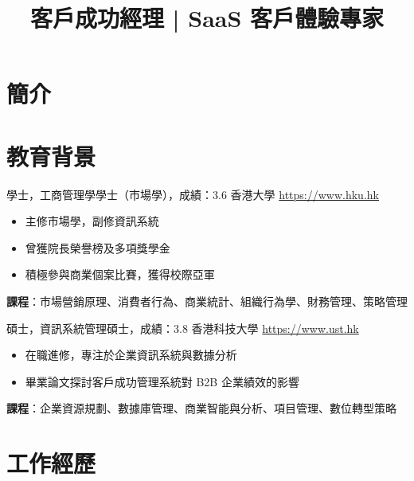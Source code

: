 \documentclass[a4paper, serif, 10pt]{moderncv}
\title{客戶成功經理 | SaaS 客戶體驗專家}
\begin{document}
\maketitle

\section{簡介}

\section{教育背景}

        {學士，工商管理學學士（市場學），成績：3.6}
        {香港大學}
        {\url{https://www.hku.hk}}
        {}
        {\begin{itemize}
\item 主修市場學，副修資訊系統
\item 曾獲院長榮譽榜及多項獎學金
\item 積極參與商業個案比賽，獲得校際亞軍
\end{itemize}
\textbf{課程}：市場營銷原理、消費者行為、商業統計、組織行為學、財務管理、策略管理}

        {碩士，資訊系統管理碩士，成績：3.8}
        {香港科技大學}
        {\url{https://www.ust.hk}}
        {}
        {\begin{itemize}
\item 在職進修，專注於企業資訊系統與數據分析
\item 畢業論文探討客戶成功管理系統對 B2B 企業績效的影響
\end{itemize}
\textbf{課程}：企業資源規劃、數據庫管理、商業智能與分析、項目管理、數位轉型策略}
\section{工作經歷}
\end{document}
